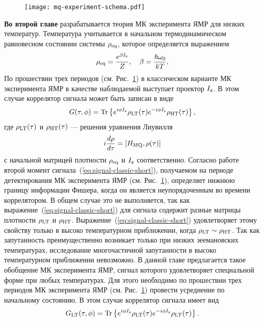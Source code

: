 \begin{figure}[H]
  \centering
  \texttt{[image: mq-experiment-schema.pdf]}
  \caption{\protect}
  \label{fig:mq-experiment-schema}
\end{figure}


\textbf{Во второй главе} разрабатывается теория МК эксперимента ЯМР для низких температур.
Температура учитывается в начальном термодинамическом равновесном состоянии системы $\rho_\mathrm{eq}$,
которое определяется выражением
%
\begin{equation}\label{eq:rho-eq}
  \rho_\mathrm{eq} = \dfrac{e^{\beta I_\mathrm{z}}}{Z}, \quad \beta = \frac{\hbar\omega_{0}}{kT},
\end{equation}
%
\rhoEqExplanatoryNote
По прошествии трех периодов
(см. Рис.~\ref{fig:mq-experiment-schema})
в классическом варианте МК эксперимента ЯМР в качестве наблюдаемой выступает проектор $I_\mathrm{z}$.
В этом случае коррелятор сигнала может быть записан в виде
\begin{equation}\label{eq:signal-classic-short}
  G(\tau, \phi) = \mathrm{Tr} \left\{ 
   e^{i\phi I_\mathrm{z}} \rho_\mathrm{LT} (\tau)
   e^{-i\phi I_\mathrm{z}} \rho_\mathrm{HT} (\tau)
   \right\},
\end{equation}
где $\rho_\mathrm{LT}(\tau)$ и $\rho_\mathrm{HT}(\tau)$ --- решения уравнения Лиувилля
\begin{equation}
  i \frac{d \rho}{d \tau} = \left[H_\mathrm{MQ}, \rho(\tau)\right]
\end{equation}
с начальной матрицей плотности $\rho_\mathrm{eq}$ и $I_\mathrm{z}$ соответственно.
Согласно работе~\cite{Garttner2018} второй момент сигнала~(\ref{eq:signal-classic-short}),
получаемом на периоде детектирования МК эксперимента ЯМР (см. Рис.~\ref{fig:mq-experiment-schema}),
определяет нижнюю границу информации Фишера,
когда он является неупорядоченным во времени коррелятором.
В общем случае это не выполняется, так как выражение~(\ref{eq:signal-classic-short}) для сигнала содержит разные матрицы плотности $\rho_\mathrm{LT}$ и $\rho_\mathrm{HT}$.
Выражение~(\ref{eq:signal-classic-short}) удовлетворяет этому свойству только в высоко температурном приближении, когда $\rho_\mathrm{LT} \sim \rho_\mathrm{HT}$.
Так как запутанность преимущественно возникает только при низких зеемановских температурах,
исследование многочастичной запутанности в высоко температурном приближении невозможно.
В данной главе предлагается такое обобщение МК эксперимента ЯМР,
сигнал которого удовлетворяет специальной форме при любых температурах.
Для этого необходимо по прошествии трех периодов МК эксперимента ЯМР (см. Рис.~\ref{fig:mq-experiment-schema}) провести усреднение по начальному состоянию.
В этом случае коррелятор сигнала имеет вид
%
\begin{equation}\label{eq:signal-generalized-short}
  G_\mathrm{LT}(\tau, \phi) = \mathrm{Tr} \left\{ 
   e^{i\phi I_\mathrm{z}} \rho_\mathrm{LT} (\tau)
   e^{-i\phi I_\mathrm{z}} \rho_\mathrm{LT} (\tau)
   \right\}.
\end{equation}
